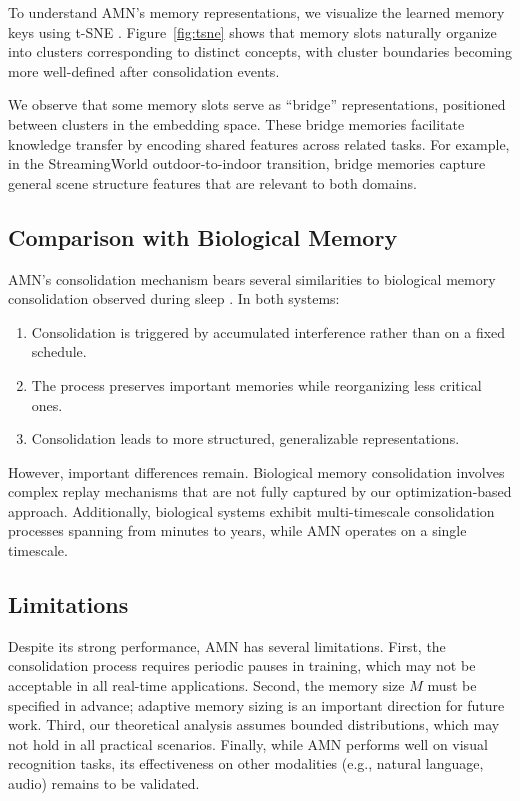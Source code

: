 \documentclass[11pt]{article}
\begin{document}
To understand AMN's memory representations, we visualize the learned memory keys using t-SNE \citep{maaten2008visualizing}. Figure~\ref{fig:tsne} shows that memory slots naturally organize into clusters corresponding to distinct concepts, with cluster boundaries becoming more well-defined after consolidation events.

We observe that some memory slots serve as ``bridge'' representations, positioned between clusters in the embedding space. These bridge memories facilitate knowledge transfer by encoding shared features across related tasks. For example, in the StreamingWorld outdoor-to-indoor transition, bridge memories capture general scene structure features that are relevant to both domains.

\subsection{Comparison with Biological Memory}

AMN's consolidation mechanism bears several similarities to biological memory consolidation observed during sleep \citep{walker2017sleep}. In both systems:
\begin{enumerate}
    \item Consolidation is triggered by accumulated interference rather than on a fixed schedule.
    \item The process preserves important memories while reorganizing less critical ones.
    \item Consolidation leads to more structured, generalizable representations.
\end{enumerate}

However, important differences remain. Biological memory consolidation involves complex replay mechanisms that are not fully captured by our optimization-based approach. Additionally, biological systems exhibit multi-timescale consolidation processes spanning from minutes to years, while AMN operates on a single timescale.

\subsection{Limitations}

Despite its strong performance, AMN has several limitations. First, the consolidation process requires periodic pauses in training, which may not be acceptable in all real-time applications. Second, the memory size $M$ must be specified in advance; adaptive memory sizing is an important direction for future work. Third, our theoretical analysis assumes bounded distributions, which may not hold in all practical scenarios. Finally, while AMN performs well on visual recognition tasks, its effectiveness on other modalities (e.g., natural language, audio) remains to be validated.
\end{document}
